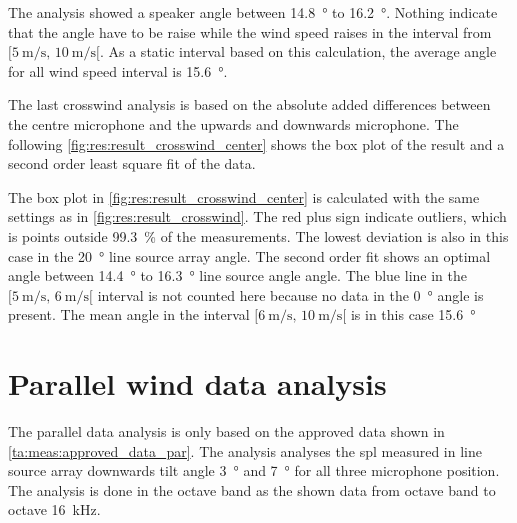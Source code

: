 The analysis showed a speaker angle between \SI{14.8}{\degree} to  \SI{16.2}{\degree}. Nothing indicate that the angle have to be raise while the wind speed raises in the interval from $[\SI{5}{\meter\per\second},\, \SI{10}{\meter\per\second}[ $. As a static interval based on this calculation, the average angle for all wind speed interval is \SI{15.6}{\degree}.

The last crosswind analysis is based on the absolute added differences between the centre microphone and the upwards and downwards microphone. The following \autoref{fig:res:result_crosswind_center} shows the box plot of the result and a second order least square fit of the data. 
 

The box plot in \autoref{fig:res:result_crosswind_center} is calculated with the same settings as in  \autoref{fig:res:result_crosswind}. The red plus sign indicate outliers, which is points outside \SI{99.3}{\percent} of the measurements. The lowest deviation is also in this case in the \SI{20}{\degree} line source array angle. The second order fit shows an optimal angle between \SI{14.4}{\degree} to \SI{16.3}{\degree} line source angle angle. The blue line in the $[\SI{5}{\meter\per\second},\, \SI{6}{\meter\per\second}[ $ interval is not counted here because no data in the \SI{0}{\degree} angle is present. The mean angle in the interval $[\SI{6}{\meter\per\second},\, \SI{10}{\meter\per\second}[ $ is in this case \SI{15.6}{\degree}
  
  

\section{Parallel wind data analysis}\label{res:par_data_ana}

The parallel data analysis is only based on the approved data shown in \autoref{ta:meas:approved_data_par}. The analysis analyses the \gls{spl} measured in line source array downwards tilt angle \SI{3}{\degree} and  \SI{7}{\degree} for all three microphone position. The analysis is done in the octave band as the shown data from octave band  to octave \SI{16}{\kilo\hertz}. 

